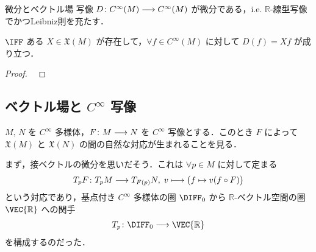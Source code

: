\documentclass[TQFT_main]{subfiles}
\begin{document}
\begin{myprop}[label=prop:vecf-derivation]{微分とベクトル場}
    写像 $D \colon C^\infty (M) \longrightarrow C^\infty(M)$ が微分である，i.e. $\mathbb{R}$-線型写像でかつLeibniz則を充たす．
    
    $\IFF$ ある $X \in \mathfrak{X}(M)$ が存在して，$\forall f \in C^\infty(M)$ に対して $D(f) = Xf$ が成り立つ．
\end{myprop}

\begin{proof}
    ~\cite[p.180, Proposition 8.15]{Lee2012smooth}
\end{proof}

\subsection{ベクトル場と $C^\infty$ 写像}

$M,\, N$ を $C^\infty$ 多様体，$F \colon M \longrightarrow N$ を $C^\infty$ 写像とする．このとき $F$ によって $\mathfrak{X}(M)$ と $\mathfrak{X}(N)$ の間の自然な対応が生まれることを見る．

まず，接ベクトルの微分を思いだそう．これは $\forall p \in M$ に対して定まる
\begin{align}
    T_{p} F \colon T_p M \longrightarrow T_{F(p)} N,\; v \longmapsto \bigl(f \mapsto v(f \circ F)\bigr)
\end{align}
という対応であり，基点付き $C^\infty$ 多様体の圏 $\DIFF_0$ から $\mathbb{R}$-ベクトル空間の圏 $\VEC{\mathbb{R}}$ への関手
\begin{align}
    T_p \colon \DIFF_0 \lto \VEC{\mathbb{R}}
\end{align}
を構成するのだった．
\end{document}
